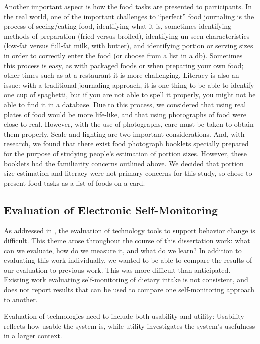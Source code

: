 Another important aspect is how the food tasks are presented to participants. In the real world, one of the important challenges to ``perfect'' food journaling is the process of seeing/eating food, identifying what it is, sometimes identifying methods of preparation (fried versus broiled), identifying un-seen characteristics (low-fat versus full-fat milk, with butter), and identifying portion or serving sizes in order to correctly enter the food (or choose from a list in a db). Sometimes this process is easy, as with packaged foods or when preparing your own food; other times such as at a restaurant it is more challenging. Literacy is also an issue: with a traditional journaling approach, it is one thing to be able to identify one cup of spaghetti, but if you are not able to spell it properly, you might not be able to find it in a database. Due to this process, we considered that using real plates of food would be more life-like, and that using photographs of food were close to real. However, with the use of photographs, care must be taken to obtain them properly. Scale and lighting are two important considerations. And, with research, we found that there exist food photograph booklets specially prepared for the purpose of studying people's estimation of portion sizes. However, these booklets had the familiarity concerns outlined above. We decided that portion size estimation and literacy were not primary concerns for this study, so chose to present food tasks as a list of foods on a card. 

\subsection{Evaluation of Electronic Self-Monitoring}
As addressed in \cite{klasnja_how_2011}, the evaluation of technology tools to support behavior change is difficult. This theme arose throughout the course of this dissertation work: what can we evaluate, how do we measure it, and what do we learn? In addition to evaluating this work individually, we wanted to be able to compare the results of our evaluation to previous work. This was more difficult than anticipated. Existing work evaluating self-monitoring of dietary intake is not consistent, and does not report results that can be used to compare one self-monitoring approach to another. 

Evaluation of technologies need to include both usability and utility: Usability reflects how usable the system is, while utility investigates the system's usefulness in a larger context.  

